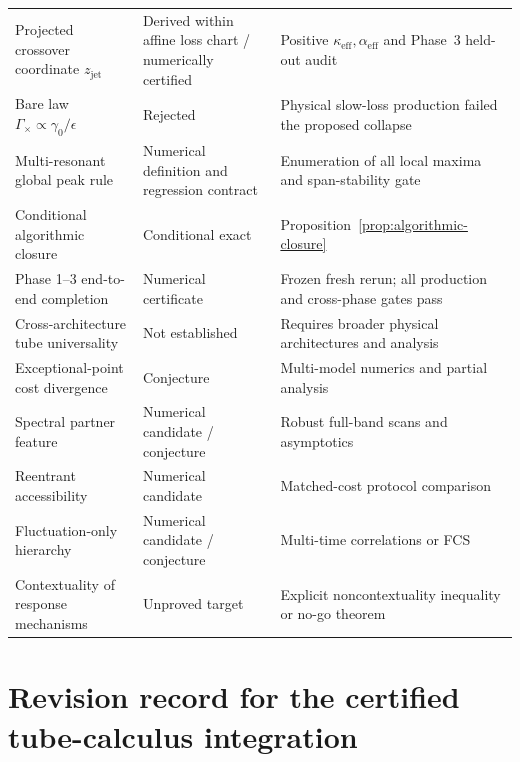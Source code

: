 \documentclass[11pt]{article}
\theoremstyle{definition}
\theoremstyle{remark}
\begin{document}
\begin{longtable}{>{\raggedright\arraybackslash}p{} >{\raggedright\arraybackslash}p{} >{\raggedright\arraybackslash}p{}}
Projected crossover coordinate $z_{\mathrm{jet}}$ & Derived within affine loss chart / numerically certified & Positive $\kappa_{\mathrm{eff}},\alpha_{\mathrm{eff}}$ and Phase~3 held-out audit\\
Bare law $\Gamma_\times\propto\gamma_0/\epsilon$ & Rejected & Physical slow-loss production failed the proposed collapse\\
Multi-resonant global peak rule & Numerical definition and regression contract & Enumeration of all local maxima and span-stability gate\\
Conditional algorithmic closure & Conditional exact & Proposition~\ref{prop:algorithmic-closure}\\
Phase 1--3 end-to-end completion & Numerical certificate & Frozen fresh rerun; all production and cross-phase gates pass\\
Cross-architecture tube universality & Not established & Requires broader physical architectures and analysis\\
Exceptional-point cost divergence & Conjecture & Multi-model numerics and partial analysis\\
Spectral partner feature & Numerical candidate / conjecture & Robust full-band scans and asymptotics\\
Reentrant accessibility & Numerical candidate & Matched-cost protocol comparison\\
Fluctuation-only hierarchy & Numerical candidate / conjecture & Multi-time correlations or FCS\\
Contextuality of response mechanisms & Unproved target & Explicit noncontextuality inequality or no-go theorem\\
\end{longtable}

\section{Revision record for the certified tube-calculus integration}
\end{document}
